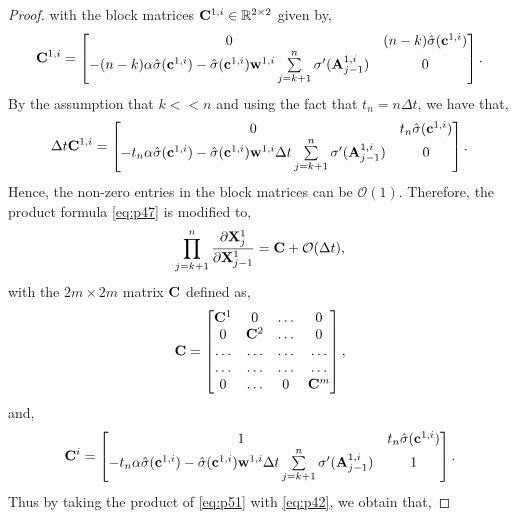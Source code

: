 \documentclass{article}
\newcommand{\bw}{{\bf w}}
\newcommand{\bA}{{\bf A}}
\newcommand{\bX}{{\bf X}}
\newcommand{\bC}{{\bf C}}
\newcommand{\bc}{{\bf c}}
\newcommand{\ord}{{\mathcal O}}
\newcommand{\R}{{\mathbb R}}
\newcommand{\Dt}{{\Delta t}}
\begin{document}
\begin{proof}
with the block matrices $\bC^{1,i} \in \R^{2 \times 2}$ given by,
\begin{equation}
    \label{eq:p49}
    \bC^{1,i}  = \begin{bmatrix}
    0 & (n-k)\hat{\sigma}(\bc^{1,i})  \\
    -(n-k)\alpha\hat{\sigma}(\bc^{1,i})  - \hat{\sigma}(\bc^{1,i})\bw^{1,i} \sum\limits_{j=k+1}^n\sigma^{\prime}(\bA^{1,i}_{j-1}) & 0 
    \end{bmatrix}.
\end{equation}
By the assumption that $k << n$ and using the fact that $t_n = n \Dt$, we have that,
\begin{equation}
    \label{eq:p50}
   \Dt \bC^{1,i}  = \begin{bmatrix}
    0 & t_n\hat{\sigma}(\bc^{1,i})  \\
    -t_n\alpha\hat{\sigma}(\bc^{1,i})  - \hat{\sigma}(\bc^{1,i})\bw^{1,i} \Dt\sum\limits_{j=k+1}^n\sigma^{\prime}(\bA^{1,i}_{j-1}) & 0 
    \end{bmatrix}.
    \end{equation}
Hence, the non-zero entries in the block matrices can be $\ord(1)$. Therefore, the product formula \eqref{eq:p47} is modified to,
\begin{equation}
    \label{eq:p51}
    \prod\limits_{j=k+1}^n  \frac{\partial \bX^1_j}{\partial \bX^1_{j-1}} = \bC + \ord(\Dt),  
\end{equation}
    with the $2m \times 2m$ matrix $\bC$ defined as,
   \begin{equation}
    \label{eq:p52}
    \bC= \begin{bmatrix}
    \bC^{1} &0 &\ldots &0 \\
    0&  \bC^{2} &\ldots &0 \\
    \ldots & \ldots & \ldots & \ldots \\
     \ldots & \ldots & \ldots & \ldots \\
     0 &\ldots & 0 &  \bC^{m}
    \end{bmatrix},
\end{equation} 
and,
\begin{equation}
    \label{eq:p53}
   \bC^{i}  = \begin{bmatrix}
    1 & t_n\hat{\sigma}(\bc^{1,i})  \\
    -t_n\alpha\hat{\sigma}(\bc^{1,i})  - \hat{\sigma}(\bc^{1,i})\bw^{1,i} \Dt\sum\limits_{j=k+1}^n\sigma^{\prime}(\bA^{1,i}_{j-1}) & 1 
    \end{bmatrix}.
    \end{equation}
Thus by taking the product of \eqref{eq:p51} with \eqref{eq:p42}, we obtain that,

\end{proof}
\end{document}
